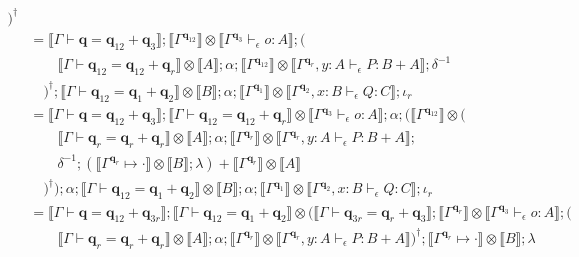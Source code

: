 \documentclass[acmsmall,screen,review]{acmart}
\newcommand{\mb}[1]{\ensuremath{\mathbf{#1}}}
\newcommand{\qsp}[4]{#1 \vdash #2 = #3 + #4}
\newcommand{\cwk}[2]{#1 \mapsto #2}
\newcommand{\hasty}[4]{#1 \vdash_{#2} #3: {#4}}
\newcommand{\dnt}[1]{\llbracket{#1}\rrbracket}
\begin{document}
\begin{itemize}
\begin{align*}
      )^\dagger \\
  &= \dnt{\qsp{\Gamma}{\mb{q}}{\mb{q}_{12}}{\mb{q}_3}}
      ; \dnt{\Gamma^{\mb{q}_{12}}} 
        \otimes \dnt{\hasty{\Gamma^{\mb{q}_3}}{\epsilon}{o}{A}}
      ; ( \\ & \qquad
        \dnt{\qsp{\Gamma}{\mb{q}_{12}}{\mb{q}_{12}}{\mb{q}_r}} \otimes \dnt{A}
        ; \alpha
        ; \dnt{\Gamma^{\mb{q}_{12}}} \otimes \dnt{\hasty{\Gamma^{\mb{q}_r}, y : A}{\epsilon}
              {P}{B + A}}
        ; \delta^{-1}
        \\ & \quad 
      )^\dagger 
      ; \dnt{\qsp{\Gamma}{\mb{q}_{12}}{\mb{q}_1}{\mb{q}_2}} \otimes \dnt{B}
      ; \alpha
      ; \dnt{\Gamma^{\mb{q}_1}} \otimes \dnt{\hasty{\Gamma^{\mb{q}_2}, x : B}{\epsilon}{Q}{C}}
      ; \iota_r \\
  &= \dnt{\qsp{\Gamma}{\mb{q}}{\mb{q}_{12}}{\mb{q}_3}}
      ; \dnt{\qsp{\Gamma}{\mb{q}_{12}}{\mb{q}_{12}}{\mb{q}_r}} 
        \otimes \dnt{\hasty{\Gamma^{\mb{q}_3}}{\epsilon}{o}{A}}
      ; \alpha 
      ; (\dnt{\Gamma^{\mb{q}_{12}}} \otimes ( \\ & \qquad
        \dnt{\qsp{\Gamma}{\mb{q}_r}{\mb{q}_r}{\mb{q}_r}} \otimes \dnt{A}
        ; \alpha
        ; \dnt{\Gamma^{\mb{q}_r}} \otimes \dnt{\hasty{\Gamma^{\mb{q}_r}, y : A}{\epsilon}
              {P}{B + A}}
        ; \\ & \qquad \delta^{-1}
        ; (\dnt{\cwk{\Gamma^{\mb{q}_r}}{\cdot}} \otimes \dnt{B} ; \lambda) 
          + \dnt{\Gamma^{\mb{q}_r}} \otimes \dnt{A}
        \\ & \quad 
      )^\dagger)
      ; \alpha
      ; \dnt{\qsp{\Gamma}{\mb{q}_{12}}{\mb{q}_1}{\mb{q}_2}} \otimes \dnt{B}
      ; \alpha
      ; \dnt{\Gamma^{\mb{q}_1}} \otimes \dnt{\hasty{\Gamma^{\mb{q}_2}, x : B}{\epsilon}{Q}{C}}
      ; \iota_r \\
  &= \dnt{\qsp{\Gamma}{\mb{q}}{\mb{q}_{12}}{\mb{q}_{3r}}}
      ; \dnt{\qsp{\Gamma}{\mb{q}_{12}}{\mb{q}_1}{\mb{q}_2}} \otimes (
        \dnt{\qsp{\Gamma}{\mb{q}_{3r}}{\mb{q}_r}{\mb{q}_3}}
        ; \dnt{\Gamma^{\mb{q}_r}} \otimes \dnt{\hasty{\Gamma^{\mb{q}_{3}}}{\epsilon}{o}{A}}
        ; ( \\ & \qquad
          \dnt{\qsp{\Gamma}{\mb{q}_r}{\mb{q}_r}{\mb{q}_r}} \otimes \dnt{A}
          ; \alpha
          ; \dnt{\Gamma^{\mb{q}_r}} \otimes \dnt{\hasty{\Gamma^{\mb{q}_r}, y : A}{\epsilon}
                {P}{B + A}}
        )^\dagger
        ; \dnt{\cwk{\Gamma^{\mb{q}_r}}{\cdot}} \otimes \dnt{B} ; \lambda \\ &\quad

\end{align*}
\end{itemize}
\end{document}

